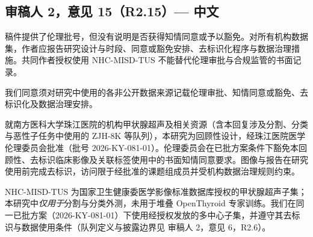\subsection*{审稿人 2，意见 15（R2.15）--- 中文}
\begin{reviewercomment}
稿件提供了伦理批号，但没有说明是否获得知情同意或予以豁免。对所有机构数据集，作者应报告研究设计与时段、同意或豁免安排、去标识化程序与数据治理措施。共同作者授权使用 NHC-MISD-TUS 不能替代伦理审批与合规监管的书面记录。
\end{reviewercomment}
\begin{authorresponse}
我们同意须对研究中使用的各非公开数据来源记载伦理审批、知情同意或豁免、去标识化及数据治理安排。\par
就南方医科大学珠江医院的机构甲状腺超声及相关资源（含本回复涉及分割、分类与恶性子任务中使用的 ZJH-8K 等队列），本研究为回顾性设计，经珠江医院医学伦理委员会批准（批号 2026-KY-081-01）。伦理委员会在已批方案条件下豁免本回顾性、去标识临床影像及关联标签使用中的书面知情同意要求。图像与报告在研究使用前完成去标识，访问限于经批准的课题组成员并受机构数据治理规则约束。\par
NHC-MISD-TUS 为国家卫生健康委医学影像标准数据库授权的甲状腺超声子集；本研究中\emph{仅用于}分割与分类外测，未用于堆叠 OpenThyroid 专家训练。我们在同一已批方案（2026-KY-081-01）下使用经授权发放的多中心子集，并遵守其去标识与数据使用条件（队列定义与披露边界见 审稿人 2，意见 6，R2.6）。\par
\end{authorresponse}
